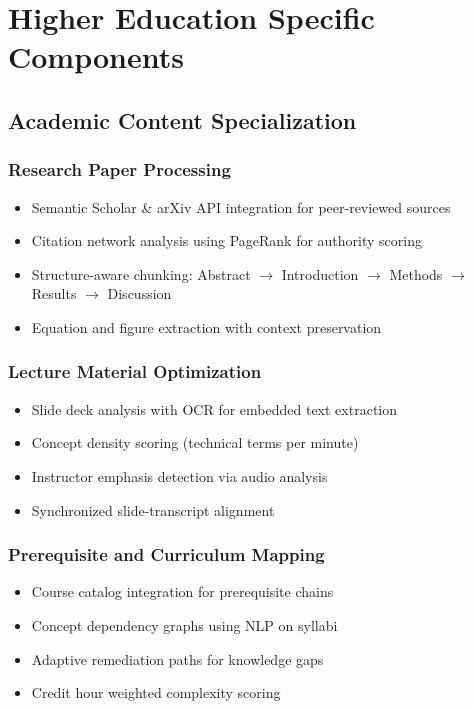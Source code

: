 \documentclass[11pt,a4paper]{report}
\begin{document}
\chapter{Higher Education Specific Components}

\section{Academic Content Specialization}

\subsection{Research Paper Processing}
\begin{itemize}
    \item Semantic Scholar \& arXiv API integration for peer-reviewed sources
    \item Citation network analysis using PageRank for authority scoring
    \item Structure-aware chunking: Abstract $\rightarrow$ Introduction $\rightarrow$ Methods $\rightarrow$ Results $\rightarrow$ Discussion
    \item Equation and figure extraction with context preservation
\end{itemize}

\subsection{Lecture Material Optimization}
\begin{itemize}
    \item Slide deck analysis with OCR for embedded text extraction
    \item Concept density scoring (technical terms per minute)
    \item Instructor emphasis detection via audio analysis
    \item Synchronized slide-transcript alignment
\end{itemize}

\subsection{Prerequisite and Curriculum Mapping}
\begin{itemize}
    \item Course catalog integration for prerequisite chains
    \item Concept dependency graphs using NLP on syllabi
    \item Adaptive remediation paths for knowledge gaps
    \item Credit hour weighted complexity scoring
\end{itemize}
\end{document}

